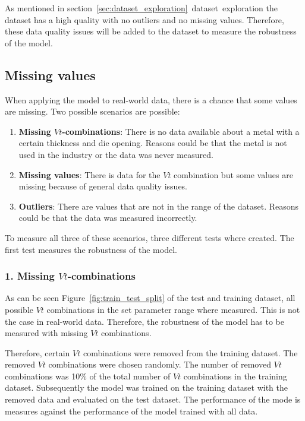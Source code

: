 As mentioned in section~\ref{sec:dataset_exploration}~dataset~exploration the dataset has a high
quality with no outliers and no missing values.
Therefore, these data quality issues will be added to the dataset to measure the robustness of
the model.

\subsection{Missing values}
When applying the model to real-world data, there is a chance that some values are missing. Two
possible scenarios are possible:

\begin{enumerate}
    \item \textbf{Missing $Vt$-combinations}: There is no data available about a metal with a
    certain thickness and die opening. Reasons could be that the metal is not used in the
    industry or the data was never measured.
    \item \textbf{Missing values}: There is data for the $Vt$ combination but some values are
    missing because of general data quality issues.
    \item \textbf{Outliers}: There are values that are not in the range of the dataset. Reasons
    could be that the data was measured incorrectly.
\end{enumerate}

To measure all three of these scenarios, three different tests where created. The first test
measures the robustness of the model.

\subsubsection*{1. Missing $Vt$-combinations}
As can be seen Figure~\ref{fig:train_test_split} of the test and training dataset, all possible
$Vt$ combinations in the set parameter range where measured.
This is not the case in real-world data. Therefore, the robustness of the model has to be
measured with missing $Vt$ combinations.

Therefore, certain $Vt$ combinations were removed from the training dataset. The removed $Vt$
combinations were chosen randomly. The number of removed $Vt$ combinations was 10\% of the total
number of $Vt$ combinations in the training dataset.
Subsequently the model was trained on the training dataset with the removed data and evaluated on
the test dataset.
The performance of the mode is measures against the performance of the model trained with all data.

